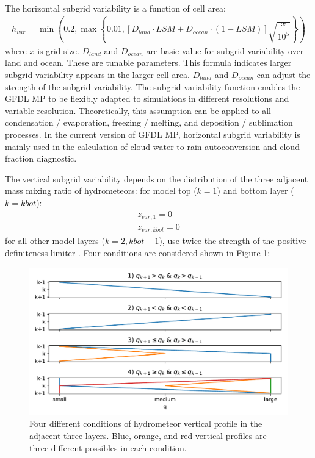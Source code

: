 \documentclass[letterpaper,titlepage,10pt]{article}
\numberwithin{equation}{section}
\begin{document}
The horizontal subgrid variability is a function of cell area:
\begin{gather}
	h_{var} = \min \left(0.2, \max \left\{0.01, \left[D_{land} \cdot LSM + D_{ocean} \cdot \left(1 - LSM \right) \right] \sqrt{\dfrac{x}{10^5}} \right\} \right)
\end{gather}
where $x$ is grid size. $D_{land}$ and $D_{ocean}$ are basic value for subgrid variability over land and ocean. These are tunable parameters. This formula indicates larger subgrid variability appears in the larger cell area. $D_{land}$ and $D_{ocean}$ can adjust the strength of the subgrid variability. The subgrid variability function enables the GFDL MP to be flexibly adapted to simulations in different resolutions and variable resolution. Theoretically, this assumption can be applied to all condensation / evaporation, freezing / melting, and deposition / sublimation processes. In the current version of GFDL MP, horizontal subgrid variability is mainly used in the calculation of cloud water to rain autoconversion and cloud fraction diagnostic.

The vertical subgrid variability depends on the distribution of the three adjacent mass mixing ratio of hydrometeors: for model top ($k = 1$) and bottom layer ($k = kbot$):
\begin{gather}
	z_{var,1} = 0 \\
	z_{var,kbot} = 0
\end{gather}
for all other model layers ($k = 2, kbot - 1$), use twice the strength of the positive definiteness limiter \citep{lin1994acla}. Four conditions are considered shown in Figure \ref{fig:fig3}:

\begin{figure}[h]
\centering
\includegraphics[width=\textwidth]{fig3.pdf}
\caption{Four different conditions of hydrometeor vertical profile in the adjacent three layers. Blue, orange, and red vertical profiles are three different possibles in each condition.}
\label{fig:fig3}
\end{figure}
\end{document}
